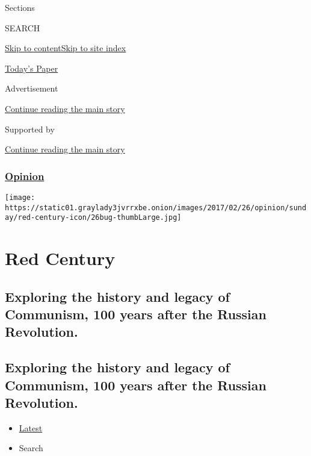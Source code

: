 Sections

SEARCH

\protect\hyperlink{site-content}{Skip to
content}\protect\hyperlink{site-index}{Skip to site index}

\href{https://myaccount.nytimes3xbfgragh.onion/auth/login?response_type=cookie\&client_id=vi}{}

\href{https://www.nytimes3xbfgragh.onion/section/todayspaper}{Today's
Paper}

Advertisement

\protect\hyperlink{after-top}{Continue reading the main story}

Supported by

\protect\hyperlink{after-sponsor}{Continue reading the main story}

\hypertarget{opinion}{%
\subsubsection{\texorpdfstring{\href{/section/opinion}{Opinion}}{Opinion}}\label{opinion}}

\texttt{[image: https://static01.graylady3jvrrxbe.onion/images/2017/02/26/opinion/sunday/red-century-icon/26bug-thumbLarge.jpg]}

\hypertarget{red-century}{%
\section{Red Century}\label{red-century}}

\hypertarget{exploring-the-history-and-legacy-of-communism-100-years-after-the-russian-revolution}{%
\subsection{Exploring the history and legacy of Communism, 100 years
after the Russian
Revolution.}\label{exploring-the-history-and-legacy-of-communism-100-years-after-the-russian-revolution}}

\hypertarget{exploring-the-history-and-legacy-of-communism-100-years-after-the-russian-revolution-1}{%
\subsection{Exploring the history and legacy of Communism, 100 years
after the Russian
Revolution.}\label{exploring-the-history-and-legacy-of-communism-100-years-after-the-russian-revolution-1}}

\begin{itemize}
\tightlist
\item
  \protect\hyperlink{stream-panel}{Latest}
\item
  Search
\end{itemize}

